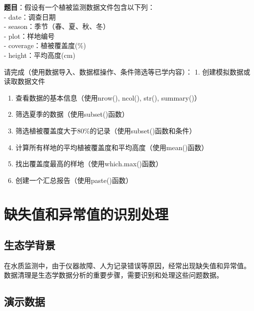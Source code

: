 \documentclass[
]{book}
\begin{document}
\textbf{题目}：假设有一个植被监测数据文件包含以下列：\\
- date：调查日期\\
- season：季节（春、夏、秋、冬）\\
- plot：样地编号\\
- coverage：植被覆盖度(\%)\\
- height：平均高度(cm)

请完成（使用数据导入、数据框操作、条件筛选等已学内容）：
1. 创建模拟数据或读取数据文件

\begin{enumerate}
\def\labelenumi{\arabic{enumi}.}
\setcounter{enumi}{1}
\item
  查看数据的基本信息（使用nrow(), ncol(), str(), summary()）
\item
  筛选夏季的数据（使用subset()函数）
\item
  筛选植被覆盖度大于80\%的记录（使用subset()函数和条件）
\item
  计算所有样地的平均植被覆盖度和平均高度（使用mean()函数）
\item
  找出覆盖度最高的样地（使用which.max()函数）
\item
  创建一个汇总报告（使用paste()函数）
\end{enumerate}

\hypertarget{ux7f3aux5931ux503cux548cux5f02ux5e38ux503cux7684ux8bc6ux522bux5904ux7406}{%
\section{缺失值和异常值的识别处理}\label{ux7f3aux5931ux503cux548cux5f02ux5e38ux503cux7684ux8bc6ux522bux5904ux7406}}

\hypertarget{ux751fux6001ux5b66ux80ccux666f-5}{%
\subsection{生态学背景}\label{ux751fux6001ux5b66ux80ccux666f-5}}

在水质监测中，由于仪器故障、人为记录错误等原因，经常出现缺失值和异常值。数据清理是生态学数据分析的重要步骤，需要识别和处理这些问题数据。

\hypertarget{ux6f14ux793aux6570ux636e-4}{%
\subsection{演示数据}\label{ux6f14ux793aux6570ux636e-4}}
\end{document}
